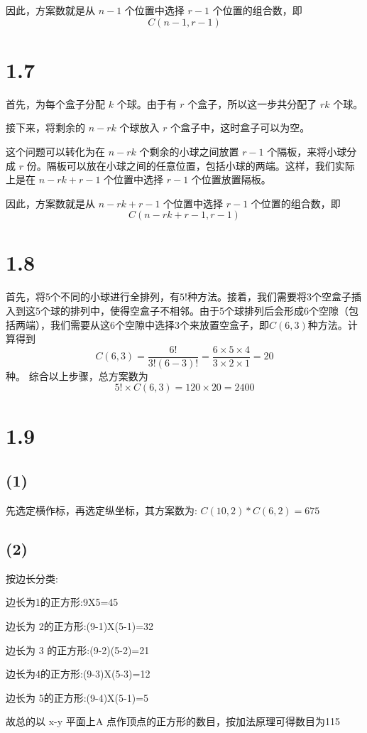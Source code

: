 \documentclass{article}
\begin{document}
\begin{CJK}{UTF8}{gbsn}
因此，方案数就是从 \( n - 1 \) 个位置中选择 \( r - 1 \) 个位置的组合数，即
\[
C(n - 1, r - 1)
\]
\section*{1.7}

首先，为每个盒子分配 $k$ 个球。由于有 $r$ 个盒子，所以这一步共分配了 $rk$ 个球。
    
接下来，将剩余的 $n - rk$ 个球放入 $r$ 个盒子中，这时盒子可以为空。
    
这个问题可以转化为在 $n - rk$ 个剩余的小球之间放置 $r - 1$ 个隔板，来将小球分成 $r$ 份。隔板可以放在小球之间的任意位置，包括小球的两端。这样，我们实际上是在 $n - rk + r - 1$ 个位置中选择 $r - 1$ 个位置放置隔板。

因此，方案数就是从 $n - rk + r - 1$ 个位置中选择 $r - 1$ 个位置的组合数，即
\[
C(n - rk + r - 1, r - 1)
\]
\section*{1.8}
首先，将5个不同的小球进行全排列，有$5!$种方法。接着，我们需要将3个空盒子插入到这5个球的排列中，使得空盒子不相邻。由于5个球排列后会形成6个空隙（包括两端），我们需要从这6个空隙中选择3个来放置空盒子，即$C(6, 3)$种方法。计算得到
    \[
    C(6, 3) = \frac{6!}{3!(6-3)!} = \frac{6 \times 5 \times 4}{3 \times 2 \times 1} = 20
    \]
    种。
综合以上步骤，总方案数为
\[
5! \times C(6, 3) = 120 \times 20 = 2400
\]

\section*{1.9}
\subsection*{(1)} 
先选定横作标，再选定纵坐标，其方案数为:
$C(10,2)*C(6,2)=675$
\subsection*{(2)} 
按边长分类:

边长为1的正方形:9X5=45

边长为 2的正方形:(9-1)X(5-1)=32

边长为 3 的正方形:(9-2)(5-2)=21

边长为4的正方形:(9-3)X(5-3)=12

边长为 5的正方形:(9-4)X(5-1)=5

故总的以 x-y 平面上A 点作顶点的正方形的数目，按加法原理可得数目为115

\end{CJK}
\end{document}
